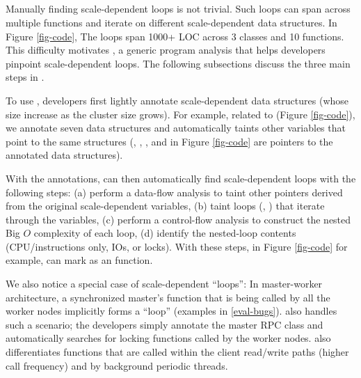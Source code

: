 
\subsection{\sfind}
\label{sc-find}

Manually finding scale-dependent loops is not trivial.  Such loops can
span across multiple functions and iterate on different scale-dependent data
structures.  In Figure \ref{fig-code}, The \oonnn loops span 1000+ LOC
across 3 classes and 10 functions.
%
This difficulty motivates \sfind, a generic program analysis that helps
developers pinpoint scale-dependent loops.  The following subsections
discuss the three main steps in \sfind.






 To use \sfind,
developers first lightly annotate scale-dependent data structures (whose
size increase as the cluster size grows).
%
For example, related to \caone (Figure \ref{fig-code}), we annotate seven
data structures and \sfind automatically taints other variables that point
to the same structures (\eg, , , and
 in Figure \ref{fig-code} are pointers to the annotated data
structures).





%
With the annotations, \sfind can then automatically find scale-dependent
loops with the following steps:
%
(a) perform a data-flow analysis to taint other pointers derived from the
original scale-dependent variables,
%
(b) taint loops (, ) that iterate through the variables,
%
(c) perform a control-flow analysis to construct the nested Big $O$
complexity of each loop,
%
(d) identify the nested-loop contents (CPU/instructions only, IOs, or
locks).
%
With these steps, in Figure \ref{fig-code} for example, \sfind can mark
 as an \oonnn function.


We also notice a special case of 
scale-dependent ``loops'': 
In master-worker architecture, a synchronized master's function
that is being called by all the worker nodes implicitly forms a ``loop''
(examples in \sec\ref{eval-bugs}).  
%
\sfind also handles such a scenario; the developers simply annotate the
master RPC class and \sfind automatically searches for locking
functions called by the worker nodes.  \sfind also differentiates
functions that are called within the client read/write paths (higher call
frequency) and by background periodic threads.

